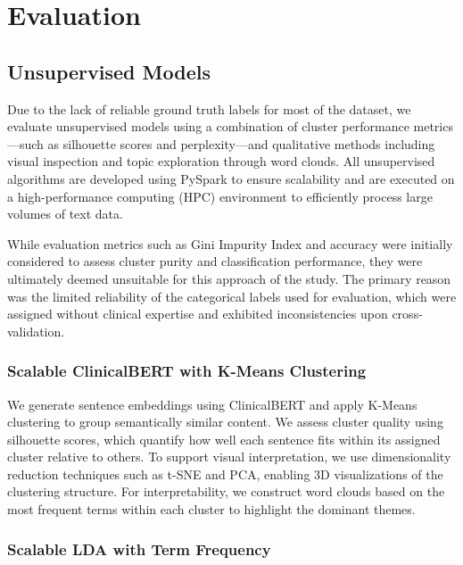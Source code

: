 \section{Evaluation}

\subsection{Unsupervised Models}

Due to the lack of reliable ground truth labels for most of the dataset, we evaluate unsupervised models using a combination of cluster performance metrics—such as silhouette scores and perplexity—and qualitative methods including visual inspection and topic exploration through word clouds. All unsupervised algorithms are developed using PySpark to ensure scalability and are executed on a high-performance computing (HPC) environment to efficiently process large volumes of text data.\medskip

While evaluation metrics such as Gini Impurity Index and accuracy were initially considered to assess cluster purity and classification performance, they were ultimately deemed unsuitable for this approach of the study. The primary reason was the limited reliability of the categorical labels used for evaluation, which were assigned without clinical expertise and exhibited inconsistencies upon cross-validation.

\subsubsection{Scalable ClinicalBERT with K-Means Clustering}

We generate sentence embeddings using ClinicalBERT and apply K-Means clustering to group semantically similar content. We assess cluster quality using silhouette scores, which quantify how well each sentence fits within its assigned cluster relative to others. To support visual interpretation, we use dimensionality reduction techniques such as t-SNE and PCA, enabling 3D visualizations of the clustering structure. For interpretability, we construct word clouds based on the most frequent terms within each cluster to highlight the dominant themes.\medskip

\subsubsection{Scalable LDA with Term Frequency}


